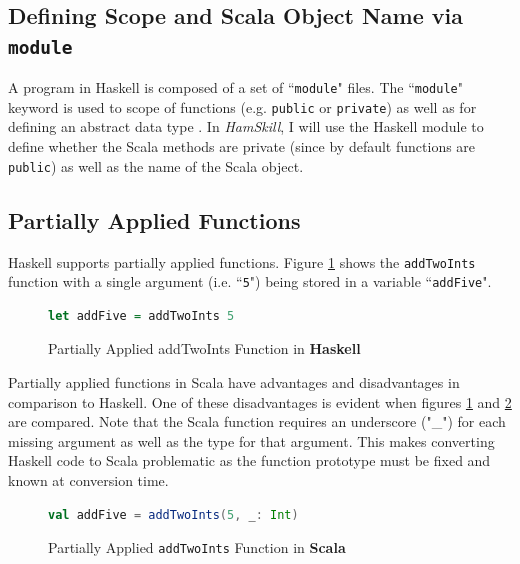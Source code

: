 \documentclass{report}
\begin{document}
\subsection{Defining Scope and Scala Object Name via {\tt module}}

A program in Haskell is composed of a set of ``{\tt module}" files.  The ``{\tt module}" keyword is used to  scope of functions (e.g. {\tt public} or {\tt private}) as well as for defining an abstract data type \cite{haskellModule}.  In \emph{HamSkill}, I will use the Haskell module to define whether the Scala methods are private (since by default functions are {\tt public}) as well as the name of the Scala object.

\subsection{Partially Applied Functions}\label{sec:partiallyAppliedFunctions}

Haskell supports partially applied functions.  Figure \ref{fig:addFiveHaskell} shows the {\tt addTwoInts} function with a single argument (i.e. ``{\tt 5}") being stored in a variable ``{\tt addFive}".  

\begin{figure}[H]
\begin{mdframed}
\begin{lstlisting}[language=Haskell]
let addFive = addTwoInts 5
\end{lstlisting}
\end{mdframed}
\caption{Partially Applied addTwoInts Function in \textbf{Haskell}}\label{fig:addFiveHaskell}
\end{figure}

Partially applied functions in Scala have advantages and disadvantages in comparison to Haskell.  One of these disadvantages is evident when figures \ref{fig:addFiveHaskell} and \ref{fig:addFiveScala} are compared.  Note that the Scala function requires an underscore ("\_") for each missing argument as well as the type for that argument.  This makes converting Haskell code to Scala problematic as the function prototype must be fixed and known at conversion time.  

\begin{figure}[H]
\begin{mdframed}
\begin{lstlisting}[language=Scala]
val addFive = addTwoInts(5, _: Int)
\end{lstlisting}
\end{mdframed}
\caption{Partially Applied {\tt addTwoInts} Function in \textbf{Scala}}\label{fig:addFiveScala}
\end{figure}
\end{document}
